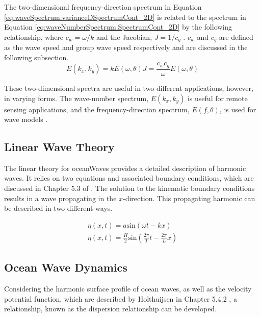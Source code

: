 The two-dimensional frequency-direction spectrum in Equation \ref{eq:waveSpectrum.varianceDSpectrumCont_2D} is related to the spectrum in Equation \ref{eq:waveNumberSpectrum.SpectrumCont_2D} by the following relationship, where $c_{w} = \omega /k$ and the Jacobian, $J = 1/c_{g}$ \cite{Holthuijsen2007}. $c_{w}$ and $c_{g}$ are defined as the wave speed and group wave speed respectively and are discussed in the following subsection.
\begin{equation} \label{eq:waveNumberSpectrum.relateE(kx,ky)toE(w,th)_2D}
    E(k_{x},k_{y}) =  k E(\omega,\theta) J = \frac{c_{w} c_{g}}{\omega} E(\omega,\theta)
\end{equation}

These two-dimensional spectra are useful in two different applications, however, in varying forms. The wave-number spectrum, $E(k_{x},k_{y})$ is useful for remote sensing applications, and the frequency-direction spectrum, $E(f,\theta)$, is used for wave models \cite{Holthuijsen2007}.

\subsection{Linear Wave Theory} \label{subsec:theory.waves.linearWaveTheory}

The linear theory for \gls{oceanWaves} provides a detailed description of harmonic waves. It relies on two equations and associated boundary conditions, which are discussed in Chapter 5.3 of \cite{Holthuijsen2007}. The solution to the kinematic boundary conditions results in a wave propagating in the $x$-direction. This propagating harmonic can be described in two different ways.

\begin{subequations}  \label{eq:linearWaveTheory.propHarmonicWave}
  \begin{align}
    \eta(x,t) = a\text{sin}(\omega t - kx) \\
    \eta(x,t) = \frac{H}{2}\text{sin} \left ( \frac{2\pi}{T}t - \frac{2\pi}{L}x \right )
  \end{align}
\end{subequations} 

\subsection{Ocean Wave Dynamics} \label{subsec:theory.waves.dynamics}

Considering the harmonic surface profile of ocean waves, as well as the velocity potential function, which are described by Holthuijsen in Chapter 5.4.2 \cite{Holthuijsen2007}, a relationship, known as the dispersion relationship can be developed.

